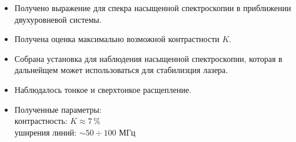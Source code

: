 \begin{itemize}
    \item Получено выражение для спекра насыщенной спектроскопии в приближении двухуровневой системы.
    \item Получена оценка максимально возможной контрастности $K$.
    \item Собрана установка для наблюдения насыщенной спектроскопии, которая в дальнейщем может использоваться для стабилизция лазера.
    \item Наблюдалось тонкое и сверхтонкое расщепление.
    \item Полученные параметры: \\
    \phantom{4242} контрастность: $K \approx 7 \,\%$ \\
    \phantom{4242} уширения линий: $\sim 50 \div 100$ МГц
\end{itemize}